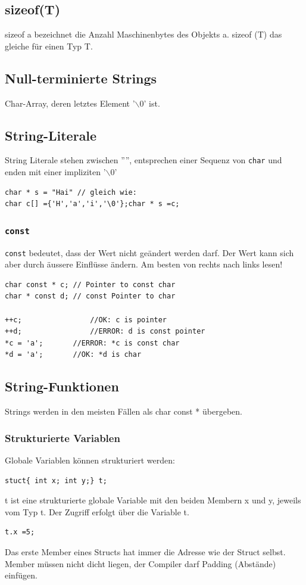 \documentclass[8pt,landscape,a4paper]{scrartcl}
\begin{document}
\begin{multicols*}{5}
\subsection{sizeof(T)}
sizeof a bezeichnet die Anzahl Maschinenbytes des Objekts a. sizeof (T) das gleiche für einen Typ T.
\subsection{Null-terminierte Strings}
Char-Array, deren letztes Element '$\backslash$0' ist.
\subsection{String-Literale}
String Literale stehen zwischen '''', entsprechen einer Sequenz von \texttt{char} und enden mit einer impliziten '$\backslash$0'
\begin{lstlisting}
char * s = "Hai" // gleich wie:
char c[] ={'H','a','i','\0'};char * s =c;
\end{lstlisting}
\subsubsection{\texttt{const}}
\texttt{const} bedeutet, dass der Wert nicht geändert werden darf. Der Wert kann sich aber durch äussere Einflüsse ändern. Am besten von rechts nach links lesen!
\begin{lstlisting}
char const * c; // Pointer to const char
char * const d; // const Pointer to char

++c; 				//OK: c is pointer
++d; 				//ERROR: d is const pointer
*c = 'a';		//ERROR: *c is const char
*d = 'a';		//OK: *d is char
\end{lstlisting}
\subsection{String-Funktionen}
Strings werden in den meisten Fällen als char const * übergeben.
\subsubsection{Strukturierte Variablen}
Globale Variablen können strukturiert werden:
\begin{lstlisting}
stuct{ int x; int y;} t;
\end{lstlisting}
t ist eine strukturierte globale Variable mit den beiden Membern x und y, jeweils vom Typ t. Der Zugriff erfolgt über die Variable t.
\begin{lstlisting}
t.x =5;
\end{lstlisting}
Das erste Member eines Structs hat immer die Adresse wie der Struct selbst. Member müssen nicht dicht liegen, der Compiler darf Padding (Abstände) einfügen.

\end{multicols*}
\end{document}
